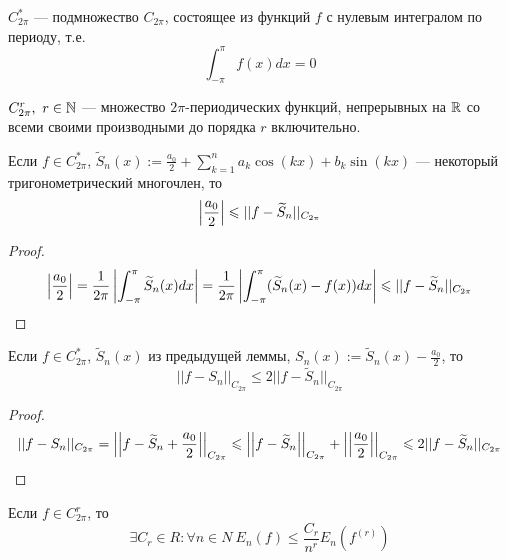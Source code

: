 \begin{designation}
	$C_{2\pi}^*$ --- подмножество $C_{2\pi}$, состоящее из функций $f$ с нулевым интегралом по периоду, т.е.
	\[
		\int_{-\pi}^\pi f(x)dx = 0
	\]
\end{designation}

\begin{designation}
	$C_{2\pi}^r, \ r \in \mathbb{N}$ --- множество $2\pi$-периодических функций, непрерывных на $\mathbb{R}$ со всеми своими производными до порядка $r$ включительно.
\end{designation}

\begin{lemma}
	Если $f \in C_{2\pi}^*$, $\widetilde S_n(x) := \frac{a_0}{2} + \sum_{k=1}^n a_k\cos(kx) + b_k\sin(kx)$ --- некоторый тригонометрический многочлен, то
	\[
		\left|\frac{a_0}{2}\right| \leqslant ||f - \widetilde S_n||_{C_{2\pi}}
	\]
\end{lemma}

\begin{proof}
	\[
		\left|\frac{a_0}{2}\right| = \frac{1}{2\pi} \left|\int_{-\pi}^{\pi} \widetilde S_n(x) dx\right| = \frac{1}{2\pi} \left|\int_{-\pi}^{\pi} (\widetilde S_n(x) - f(x)) dx\right| \leqslant ||f - \widetilde S_n||_{C_{2\pi}}
	\]
\end{proof}

\begin{corollary} \label{what_if_we_remove_a_0}
	Если $f \in C_{2\pi}^*$, $\widetilde S_n(x)$ из предыдущей леммы, $S_n(x) := \widetilde S_n(x) - \frac{a_0}{2}$, то
	\[
		||f - S_n||_{C_{2\pi}} \leq 2||f - \widetilde S_n||_{C_{2\pi}}
	\]
\end{corollary}

\begin{proof}
	\[
		||f - S_n||_{C_{2\pi}} = \left|\left|f - \widetilde S_n + \frac{a_0}{2}\right|\right|_{C_{2\pi}} \leqslant \left|\left|f - \widetilde S_n\right|\right|_{C_{2\pi}} + \left|\left|\frac{a_0}{2}\right|\right|_{C_{2\pi}} \leqslant 2||f - \widetilde S_n||_{C_{2\pi}}
	\]
\end{proof}

\begin{corollary} \label{r-th_derivative_approx}
	Если $f \in C_{2\pi}^r$, то
	\[
		\exists C_r \in R : \forall n \in N \ E_n(f) \leq \frac{C_r}{n^r} E_n(f^{(r)})
	\]
\end{corollary}

